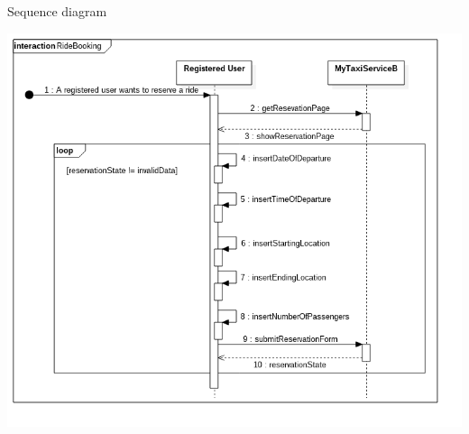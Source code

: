 \documentclass[11pt]{article} %
\begin{document}
\begin{enumerate}
		Sequence diagram
		\begin{center}
		\includegraphics[scale=0.52]{usecase2.png}
		\end{center}
	

\end{enumerate}
\end{document}
